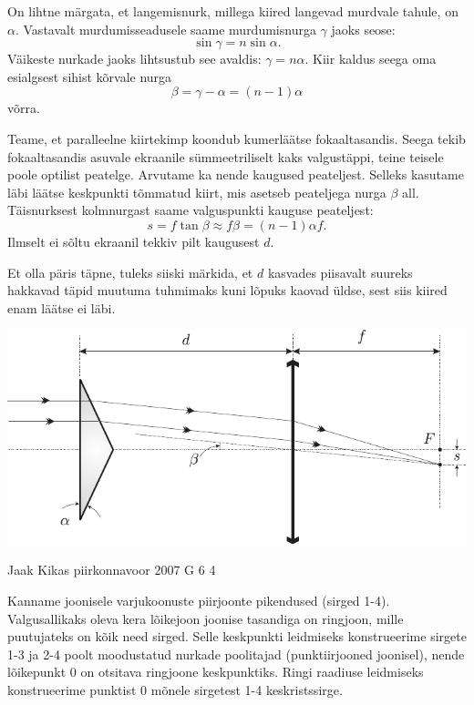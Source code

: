 \documentclass[11pt]{article}
\begin{document}
{{On lihtne märgata, et langemisnurk, millega kiired langevad murdvale tahule, on $\alpha$. 
Vastavalt murdumisseadusele saame murdumisnurga $\gamma$ jaoks seose:
\[
\sin \gamma = n \sin \alpha.
\]
Väikeste nurkade jaoks lihtsustub see avaldis: $\gamma = n\alpha$. Kiir kaldus seega oma esialgsest sihist kõrvale nurga
\[
\beta = \gamma - \alpha = (n - 1) \alpha
\]
võrra. 

Teame, et paralleelne kiirtekimp koondub kumerläätse fokaaltasandis. Seega tekib fokaaltasandis asuvale ekraanile sümmeetriliselt kaks valgustäppi, teine teisele poole optilist peatelge. Arvutame ka nende kaugused peateljest. Selleks kasutame läbi läätse keskpunkti tõmmatud kiirt, mis asetseb peateljega nurga $\beta$ all. Täisnurksest kolmnurgast saame valguspunkti kauguse peateljest:
\[
s = f \tan \beta \approx f \beta = (n - 1)\alpha f.
\]
Ilmselt ei sõltu ekraanil tekkiv pilt kaugusest $d$.

Et olla päris täpne, tuleks siiski märkida, et $d$ kasvades piisavalt suureks hakkavad täpid muutuma tuhmimaks kuni lõpuks kaovad üldse, sest siis kiired enam läätse ei läbi.

\begin{center}
	\includegraphics[width=\linewidth]{2006-v2g-06-lah}
\end{center}
\fi
}

{Jaak Kikas} %
{piirkonnavoor} %
{2007} %
{G 6} %
{4} %
{

\ifSolution
Kanname joonisele varjukoonuste piirjoonte pikendused (sirged 1-4). Valgusallikaks oleva kera lõikejoon joonise tasandiga on ringjoon, mille puutujateks on kõik need sirged. Selle keskpunkti leidmiseks konstrueerime sirgete 1-3 ja 2-4 poolt moodustatud nurkade poolitajad (punktiirjooned joonisel), nende lõikepunkt 0 on otsitava ringjoone keskpunktiks. Ringi raadiuse leidmiseks konstrueerime punktist 0 mõnele sirgetest 1-4 keskristssirge.

}}
\end{document}
